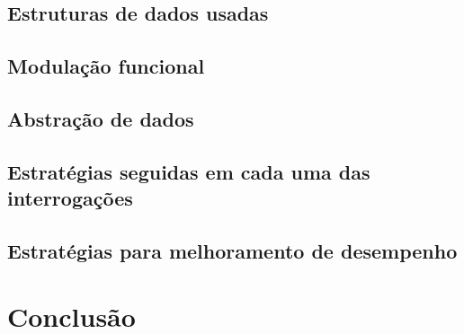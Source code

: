 \documentclass[10pt]{report}
\begin{document}
\section{Estruturas de dados usadas}

\section{Modulação funcional}

\section{Abstração de dados}

\section{Estratégias seguidas em cada uma das interrogações}

\section{Estratégias para melhoramento de desempenho}
\fi

\chapter{Conclusão}
\label{sec:conclusao}
\end{document}
